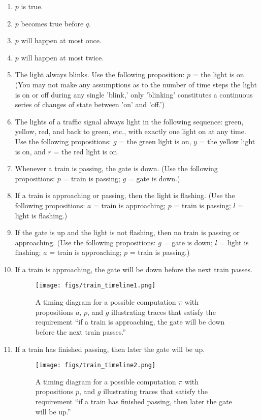 \documentclass{elsarticle} %
\begin{document}
\begin{enumerate}
\item $p$ is true.
\item $p$ becomes true before $q$.
\item $p$ will happen at most once.
\item $p$ will happen at most twice.
\item  The light always blinks. Use the following proposition: $p$ = the light is on. (You may not make any assumptions as to the number of time steps the light is on or off during any single 'blink,' only 'blinking' constitutes a continuous series of changes of state between 'on' and 'off.')
\item  The lights of a traffic signal always light in the following sequence: green, yellow, red, and back to green, etc., with exactly one light on at any time. Use the following propositions: $g$ = the green light is on, $y$ = the yellow light is on, and $r$ = the red light is on.
\item  Whenever a train is passing, the gate is down. (Use the following propositions: $p$ = train is passing; $g$ = gate is down.)
\item   If a train is approaching or passing, then the light is flashing. (Use the following propositions: $a$ = train is approaching; $p$ = train is passing; $l$ = light is flashing.)
\item   If the gate is up and the light is not flashing, then no train is passing or approaching. (Use the following propositions: $g$ = gate is down; $l$ = light is flashing; $a$ = train is approaching; $p$ = train is passing.)
\item   If a train is approaching, the gate will be down before the next train passes.
\begin{figure}[H]
  \begin{center}
     \texttt{[image: figs/train\_timeline1.png]}
  \end{center}
\caption{A timing diagram for a possible computation $\pi$ with propositions $a$, $p$, and $g$ illustrating traces that satisfy the requirement ``if a train is approaching, the gate will be down before the next train passes.''}
\end{figure}

\item   If a train has finished passing, then later the gate will be up.
\begin{figure}[H]
  \begin{center}
     \texttt{[image: figs/train\_timeline2.png]}
  \end{center}
\caption{A timing diagram for a possible computation $\pi$ with propositions $p$, and $g$ illustrating traces that satisfy the requirement ``if a train has finished passing, then later the gate will be up.''}
\end{figure}


\end{enumerate}
\end{document}
